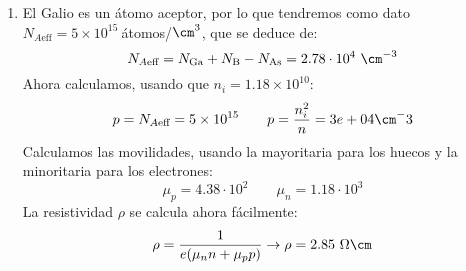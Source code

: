 \begin{enumerate}[label=\alph*)]
		\item El Galio es un átomo aceptor, por lo que tendremos como dato $N_{A\text{eff}}=5 \times 10^{15} \ $átomos/$\cm^3$, que se deduce de:
		\begin{equation}
			N_{A\text{eff}} = N_{\text{Ga}} + N_{\text{B}} - N_{\text{As}} =  2.78 \cdot 10^4 \ \cm^{-3}
		\end{equation}
		Ahora calculamos, usando que $n_i=1.18\times 10^{10}$:
		\begin{equation}
			p = N_{A\text{eff}} = 5 \times 10^{15} \qquad p = \frac{n_i^2}{n} = 3e+04 \cm^-3
		\end{equation}
		Calculamos las movilidades, usando la mayoritaria para los huecos y la minoritaria para los electrones:
		\begin{equation}
			\mu_p=4.38 \cdot 10^{2}  \qquad
			\mu_n=1.18 \cdot 10^{3}
		\end{equation}
		La resistividad $\rho$ se calcula ahora fácilmente:
		\begin{equation}
			\rho = \frac{1}{e(\mu_n n + \mu_pp)} \rightarrow
			\rho = 2.85 \ \Omega \cm
		\end{equation}
	\end{enumerate}
